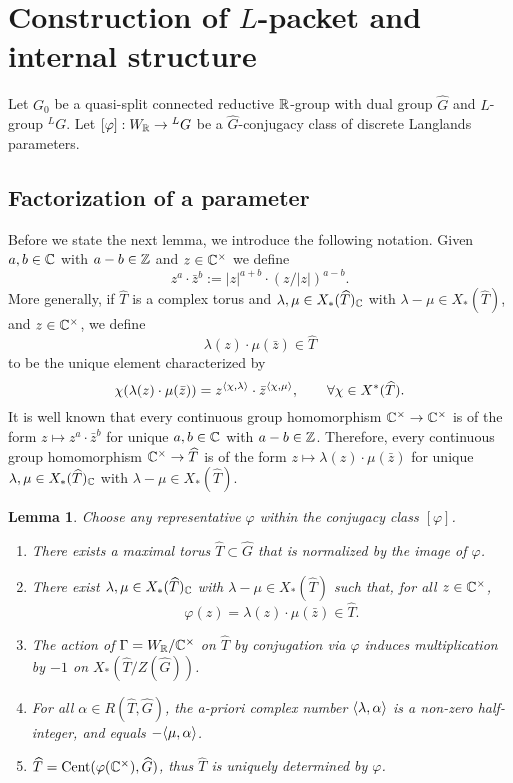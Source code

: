 \documentclass{article}
\newtheorem{lem}[thm]{Lemma}
\theoremstyle{definition}
\numberwithin{equation}{section}
\renewcommand{\-}{\hyp{}}
\begin{document}
\section{Construction of $L$\-packet and internal structure} \label{sec:cons}

Let $G_0$ be a quasi-split connected reductive $\mathbb{R}$-group with dual group $\hat G$ and $L$\-group $^LG$.
Let $[\varphi] : W_{\mathbb{R}} \to {^LG}$ be a $\hat G$-conjugacy class of discrete Langlands parameters.

\subsection{Factorization of a parameter} \label{sub:fac}

Before we state the next lemma, we introduce the following notation. Given $a,b \in \mathbb{C}$ with $a-b \in \mathbb{Z}$ and $z \in \mathbb{C}^\times$ we define
\[ z^a \cdot \bar z^b := |z|^{a+b} \cdot (z/|z|)^{a-b}. \]
More generally, if $\hat T$ is a complex torus and $\lambda,\mu \in X_*(\widehat T)_{\mathbb{C}}$ with $\lambda-\mu \in X_*(\hat T)$, and $z \in \mathbb{C}^\times$, we define
\[ \lambda(z) \cdot \mu(\bar z) \in \hat T \]
to be the unique element characterized by 
\[ \chi(\lambda(z) \cdot \mu(\bar z)) = z^{\langle\chi,\lambda\rangle} \cdot \bar z^{\langle\chi,\mu\rangle},\qquad \forall \chi \in X^*(\widehat T).\]
It is well known that every continuous group homomorphism $\mathbb{C}^\times \to \mathbb{C}^\times$ is of the form $z \mapsto z^a \cdot \bar z^b$ for unique $a,b \in \mathbb{C}$ with $a-b \in \mathbb{Z}$. Therefore, every continuous group homomorphism $\mathbb{C}^\times \to \widehat T$ is of the form $z \mapsto \lambda(z) \cdot \mu(\bar z)$ for unique $\lambda,\mu \in X_*(\widehat T)_{\mathbb{C}}$ with $\lambda-\mu \in X_*(\hat T)$.

\begin{lem} \label{lem:icreg}
Choose any representative $\varphi$ within the conjugacy class $[\varphi]$. 
\begin{enumerate}
\item There exists a maximal torus $\hat T \subset \hat G$ that is normalized by the image of $\varphi$. 
\item There exist $\lambda,\mu \in X_*(\widehat T)_{\mathbb{C}}$ with $\lambda-\mu \in X_*(\hat T)$ such that, for all $z \in \mathbb{C}^\times$,
\[ \varphi(z) = \lambda(z) \cdot \mu(\bar z) \in \hat T. \]
\item The action of $\Gamma=W_{\mathbb{R}}/\mathbb{C}^\times$ on $\hat T$ by conjugation via $\varphi$ induces multiplication by $-1$ on $X_*(\hat T/Z(\hat G))$.
\item For all $\alpha \in R(\hat T,\hat G)$, the a-priori complex number $\langle\lambda,\alpha\rangle$ is a non-zero half-integer, and equals $-\langle\mu,\alpha\rangle$.
\item $\widehat T=\textrm{Cent}(\varphi(\mathbb{C}^\times),\widehat G)$, thus $\hat T$ is uniquely determined by $\varphi$.
\end{enumerate}
\end{lem}
\end{document}
